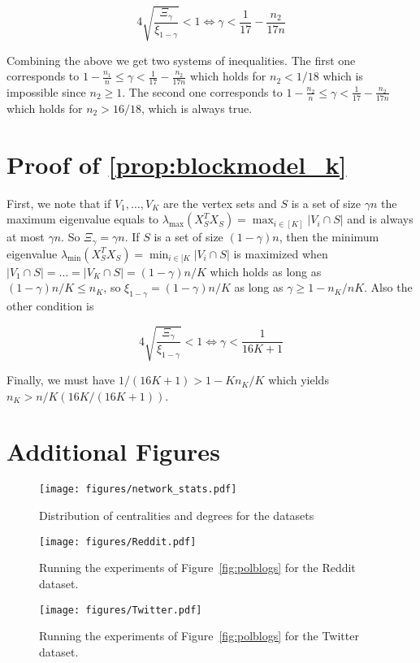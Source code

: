     \begin{equation*}
        4 \sqrt {\frac {\Xi_\gamma} {\xi_{1 - \gamma}}} < 1 \iff \gamma < \frac {1} {17} - \frac {n_2} {17n}
    \end{equation*}

    Combining the above we get two systems of inequalities. The first one corresponds to $1 - \frac {n_1} {n} \le \gamma < \frac {1} {17} - \frac {n_2} {17n}$ which holds for $n_2 < 1/18$ which is impossible since $n_2 \ge 1$. The second one corresponds to $1 - \frac {n_2} n \le \gamma < \frac {1} {17} - \frac {n_2} {17n}$ which holds for $n_2 > 16/18$, which is always true. 

\section{Proof of \cref{prop:blockmodel_k}}

First, we note that if $V_1, \dots, V_K$ are the vertex sets and $S$ is a set of size $\gamma n$ the maximum eigenvalue equals to $\lambda_{\max} (X_S^T X_S) = \max_{i \in [K]} |V_i \cap S|$ and is always at most $\gamma n$. So $\Xi_\gamma = \gamma n$. If $S$ is a set of size $(1 - \gamma) n$, then the minimum eigenvalue $\lambda_{\min}(X_S^T X_S) = \min_{i \in [K} |V_i \cap S|$ is maximized when $|V_1 \cap S| = \dots = |V_K \cap S| = (1 - \gamma) n / K$ which holds as long as $(1 - \gamma)n / K \le n_K$, so $\xi_{1 - \gamma} = (1 - \gamma)n / K$ as long as $\gamma \ge 1 -  n_K/n  K$. Also the other condition is 


    \begin{equation*}
        4 \sqrt {\frac {\Xi_\gamma} {\xi_{1 - \gamma}}} < 1 \iff \gamma < \frac {1} {16K + 1}
    \end{equation*}

    Finally, we must have $1 / (16K + 1) > 1 -  K n_K / K$ which yields $n_K > n/K (16K / (16K + 1))$.

\clearpage

\section{Additional Figures} \label{app:additional_figures}

\begin{figure}[!ht]
    \centering
    \texttt{[image: figures/network\_stats.pdf]}
    \caption{Distribution of centralities and degrees for the datasets}
    \label{fig:network_stats}
    \texttt{[image: figures/Reddit.pdf]}
    \caption{Running the experiments of Figure~\ref{fig:polblogs} for the Reddit dataset.}
    \label{fig:reddit}
    \texttt{[image: figures/Twitter.pdf]}
    \caption{Running the experiments of Figure~\ref{fig:polblogs} for the Twitter dataset.}
    \label{fig:twitter}
\end{figure}